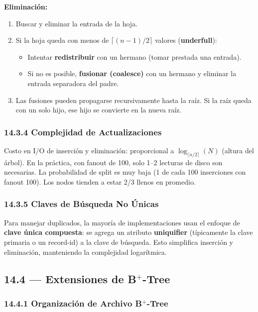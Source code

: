 \documentclass[11pt, a4paper]{article}
\begin{document}
\textbf{Eliminación:}
\begin{enumerate}[nosep]
	\item Buscar y eliminar la entrada de la hoja.
	\item Si la hoja queda con menos de $\lceil (n-1)/2 \rceil$ valores (\textbf{underfull}):
	      \begin{itemize}[nosep]
		      \item Intentar \textbf{redistribuir} con un hermano (tomar prestada una entrada).
		      \item Si no es posible, \textbf{fusionar (coalesce)} con un hermano y eliminar la entrada separadora del padre.
	      \end{itemize}
	\item Las fusiones pueden propagarse recursivamente hasta la raíz. Si la raíz queda con un solo hijo, ese hijo se convierte en la nueva raíz.
\end{enumerate}

\subsubsection{14.3.4 Complejidad de Actualizaciones}

Costo en I/O de inserción y eliminación: proporcional a $\log_{\lceil n/2 \rceil}(N)$ (altura del árbol). En la práctica, con fanout de 100, solo 1--2 lecturas de disco son necesarias. La probabilidad de split es muy baja (1 de cada 100 inserciones con fanout 100). Los nodos tienden a estar 2/3 llenos en promedio.

\subsubsection{14.3.5 Claves de Búsqueda No Únicas}

Para manejar duplicados, la mayoría de implementaciones usan el enfoque de \textbf{clave única compuesta}: se agrega un atributo \textbf{uniquifier} (típicamente la clave primaria o un record-id) a la clave de búsqueda. Esto simplifica inserción y eliminación, manteniendo la complejidad logarítmica.

\subsection{14.4 --- Extensiones de B$^+$-Tree}

\subsubsection{14.4.1 Organización de Archivo B$^+$-Tree}
\end{document}
